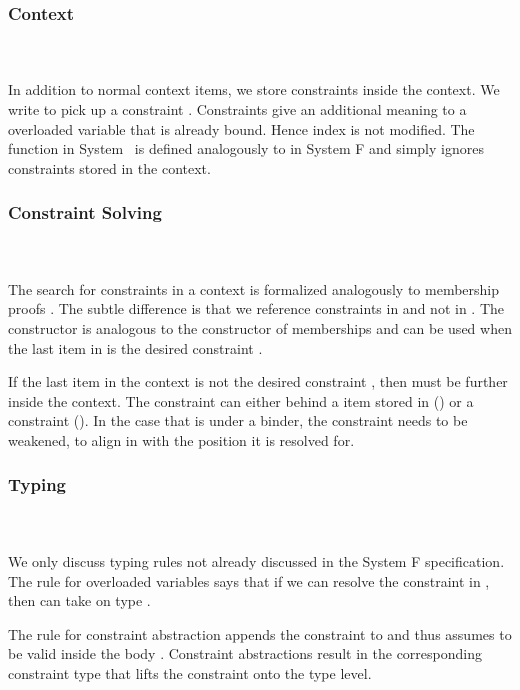 \subsubsection{Context}\hfill\\\\
In addition to normal context items, we store constraints inside the context.
\FoCtx
We write    to pick up a constraint . 
Constraints give an additional meaning to a overloaded variable that is already bound. Hence index  is not modified. The  function in System \Fo\ is defined analogously to  in System F and simply ignores constraints stored in the context.

\subsubsection{Constraint Solving}\hfill\\\\
The search for constraints in a context is formalized analogously to membership proofs   . The subtle difference is that we reference constraints in  and not in . 
\FoCstrSolve
The  constructor is analogous to the  constructor of memberships and can be used when the last item in  is the desired constraint .

\noindent If the last item in the context is not the desired constraint , then  must be further inside the context. The constraint can either behind a item stored in  () or a constraint (). In the case that  is under a binder, the constraint needs to be weakened, to align in  with the position it is resolved for. 

\subsubsection{Typing}\hfill\\\\
We only discuss typing rules not already discussed in the System F specification. 
\FoTyping
The rule for overloaded variables  says that if we can resolve the constraint  \Constr{:}  in , then  can take on type . 

\noindent The rule for constraint abstraction  appends the constraint  to  and thus assumes  to be valid inside the body . Constraint abstractions result in the corresponding constraint type \Constr{[}  \Constr{]⇒}  that lifts the constraint onto the type level.

